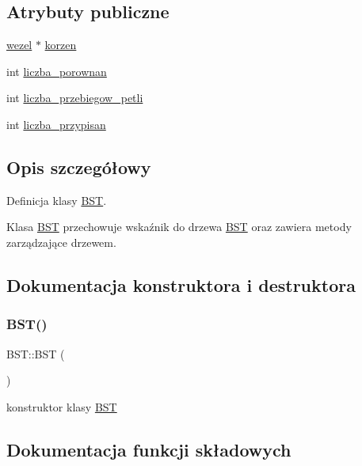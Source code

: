 \subsection*{Atrybuty publiczne}
\begin{DoxyCompactItemize}
\item 
\mbox{\hyperlink{classwezel}{wezel}} $\ast$ \mbox{\hyperlink{class_b_s_t_a8b2f27f4b58aceda99b397e3f5447e6a}{korzen}}
\item 
int \mbox{\hyperlink{class_b_s_t_a7c4c3ea4245b2eb6e0c87720743c03b4}{liczba\+\_\+porownan}}
\item 
int \mbox{\hyperlink{class_b_s_t_abd1f7811c4077eecacb5a4ab2013ef53}{liczba\+\_\+przebiegow\+\_\+petli}}
\item 
int \mbox{\hyperlink{class_b_s_t_a8d4e71cbb02976259d9893169ea2b6ac}{liczba\+\_\+przypisan}}
\end{DoxyCompactItemize}


\subsection{Opis szczegółowy}
Definicja klasy \mbox{\hyperlink{class_b_s_t}{B\+ST}}. 

Klasa \mbox{\hyperlink{class_b_s_t}{B\+ST}} przechowuje wskaźnik do drzewa \mbox{\hyperlink{class_b_s_t}{B\+ST}} oraz zawiera metody zarządzające drzewem. 

\subsection{Dokumentacja konstruktora i destruktora}
\mbox{\label{class_b_s_t_abc17123a0367c3b8ad0382eeb3ad3178}} 
\subsubsection{\texorpdfstring{B\+S\+T()}{BST()}}
{\footnotesize\ttfamily B\+S\+T\+::\+B\+ST (\begin{DoxyParamCaption}{ }\end{DoxyParamCaption})}

konstruktor klasy \mbox{\hyperlink{class_b_s_t}{B\+ST}} 

\subsection{Dokumentacja funkcji składowych}
\mbox{\label{class_b_s_t_a14df9d739a34fd8c391c07df9e5ca1d3}} 

